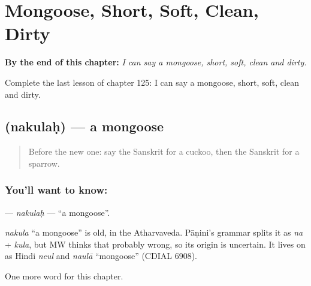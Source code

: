 
\chapter{Mongoose, Short, Soft, Clean, Dirty}
\label{ch:sa-mongoose-short-soft-clean-dirty}

\begin{chapteropening}
\textbf{By the end of this chapter:} \emph{I can say a mongoose, short, soft, clean and dirty.}

Complete the last lesson of chapter 125: I can say a mongoose, short, soft, clean and dirty.
\end{chapteropening}

\section[\texorpdfstring{\sk{नकुलः} (nakulaḥ)}{नकुलः (nakulaḥ)}]{ (nakulaḥ) — a mongoose}

\label{lesson:SA-C125-nakulah}



\begin{quote}
Before the new one: say the Sanskrit for a cuckoo, then the Sanskrit for a sparrow.
\end{quote}

\subsection*{You'll want to know: }
\textbf{} — \emph{nakulaḥ} — \textquotedblleft{}a mongoose\textquotedblright{}.

\begin{cousinweb}
\emph{nakula} \textquotedblleft{}a mongoose\textquotedblright{} is old, in the Atharvaveda. Pāṇini's grammar splits it as \emph{na} + \emph{kula}, but MW thinks that probably wrong, so its origin is uncertain. It lives on as Hindi \emph{neul} and \emph{naulā} \textquotedblleft{}mongoose\textquotedblright{} (CDIAL 6908).
\end{cousinweb}

\begin{grammarlens}[title={What you've built}]
One more word for this chapter.
\end{grammarlens}

